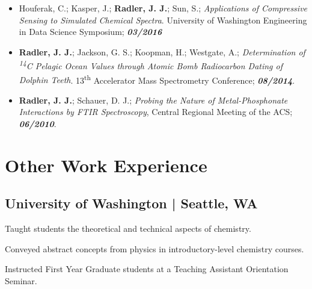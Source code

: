 \documentclass[letterpaper]{deedy-resume} %
\begin{document}
\begin{minipage}[t]{0.65\textwidth}
\begin{itemize}
\item Houferak, C.; Kasper, J.; \textbf{Radler, J. J.}; Sun, S.; \emph{Applications of Compressive Sensing to Simulated Chemical Spectra}. University of Washington Engineering in Data Science Symposium;	\textbf{\textit{03/2016}}

\item \textbf{Radler, J. J.}; Jackson, G. S.; Koopman, H.; Westgate, A.; \emph{Determination of \textsuperscript{14}C Pelagic Ocean Values through Atomic Bomb Radiocarbon Dating of Dolphin Teeth}. 13\textsuperscript{th} Accelerator Mass Spectrometry Conference;	\textbf{\textit{08/2014}}.

\item \textbf{Radler, J. J.}; Schauer, D. J.; \emph{Probing the Nature of Metal-Phosphonate Interactions by FTIR Spectroscopy}, Central Regional Meeting of the ACS;	\textbf{\textit{06/2010}}.
\end{itemize}

\section{Other Work Experience}
\subsection{University of Washington | Seattle, WA}
\begin{tightitemize}
\item Taught students the theoretical and technical aspects of chemistry.
\item Conveyed abstract concepts from physics in introductory-level chemistry courses.
\item Instructed First Year Graduate students at a Teaching Assistant Orientation Seminar.
\end{tightitemize}
\sectionspace

\end{minipage}
\end{document}
